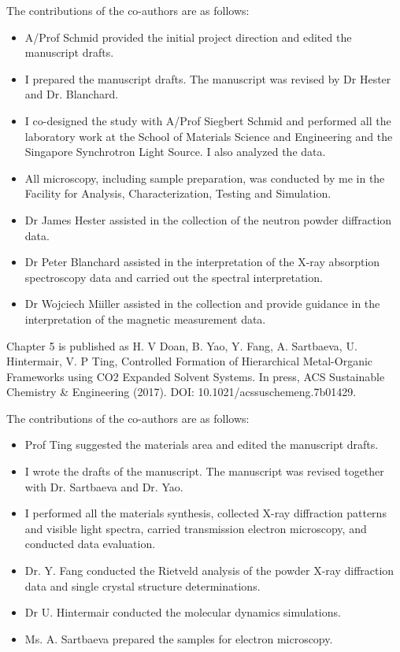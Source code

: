 {The contributions of the co-authors are as follows:
\begin{itemize}
    \item A/Prof Schmid provided the initial project direction and edited the manuscript drafts.
    \item I prepared the manuscript drafts.  The manuscript was revised by Dr Hester and Dr. Blanchard.
    \item I co-designed the study with A/Prof Siegbert Schmid and performed all the laboratory work at the School of Materials Science and Engineering and the Singapore Synchrotron Light Source.   I also analyzed the data.
    \item All microscopy, including sample preparation, was conducted by me in the Facility for Analysis, Characterization, Testing and Simulation.
    \item Dr James Hester assisted in the collection of the neutron powder diffraction data.
    \item Dr Peter Blanchard assisted in the interpretation of the X-ray absorption spectroscopy data and carried out the spectral interpretation.
    \item Dr Wojciech Miiller assisted in the collection and provide guidance in the interpretation of the magnetic measurement data.
\end{itemize}

Chapter 5 is published as H. V Doan, B. Yao, Y. Fang, A. Sartbaeva, U. Hintermair, V. P Ting, Controlled Formation of Hierarchical Metal-Organic Frameworks using CO2 Expanded Solvent Systems. In press, ACS Sustainable Chemistry \& Engineering (2017). DOI: 10.1021/acssuschemeng.7b01429.

The contributions of the co-authors are as follows:
\begin{itemize}
    \item Prof Ting suggested the materials area and edited the manuscript drafts.
    \item I wrote the drafts of the manuscript.  The manuscript was revised together with Dr. Sartbaeva and Dr. Yao.
    \item I performed all the materials synthesis, collected X-ray diffraction patterns and visible light spectra, carried transmission electron microscopy, and conducted data evaluation.
    \item Dr. Y. Fang conducted the Rietveld analysis of the powder X-ray diffraction data and single crystal structure determinations.
    \item Dr U. Hintermair conducted the molecular dynamics simulations.
    \item Ms. A. Sartbaeva prepared the samples for electron microscopy.
\end{itemize}

}
